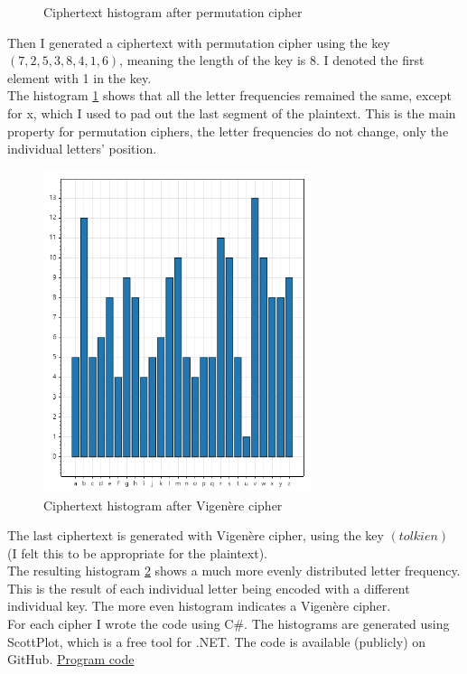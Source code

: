 \documentclass{article}
\begin{document}
\begin{enumerate}[label={}]
\begin{figure}[H]
			\caption{Ciphertext histogram after permutation cipher}
			\label{fig:permutedHist}
		\end{figure}
		Then I generated a ciphertext with permutation cipher using the key $(7, 2, 5, 3, 8, 4, 1, 6)$, meaning the length of the key is 8. I denoted the first element with 1 in the key.\\
		The histogram \ref{fig:permutedHist} shows that all the letter frequencies remained the same, except for x, which I used to pad out the last segment of the plaintext. This is the main property for permutation ciphers, the letter frequencies do not change, only the individual letters' position.
		\begin{figure}[H]
			\centering
			\includegraphics[width=0.7\textwidth]{vigenere.png}
			\caption{Ciphertext histogram after Vigenère cipher}
			\label{fig:vigenerelHist}
		\end{figure}
		The last ciphertext is generated with Vigenère cipher, using the key $(tolkien)$ (I felt this to be appropriate for the plaintext).\\
		The resulting histogram \ref{fig:vigenerelHist} shows a much more evenly distributed letter frequency. This is the result of each individual letter being encoded with a different individual key. The more even histogram indicates a Vigenère cipher.\\
		For each cipher I wrote the code using C\#. The histograms are generated using ScottPlot, which is a free tool for .NET. The code is available (publicly) on GitHub. \hyperlink{https://github.com/halkszavu/Encryption-Homework-2025/blob/main/Code/Homework-Calculations/Homework-Calculations/Program.cs}{Program code}

\end{enumerate}
\end{document}
